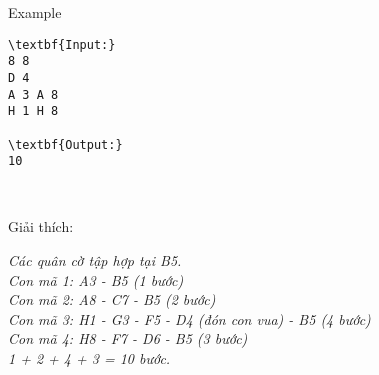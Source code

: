Example
\begin{verbatim}
\textbf{Input:}
8 8
D 4
A 3 A 8
H 1 H 8

\textbf{Output:}
10\end{verbatim}

 

Giải thích:

\emph{Các quân cờ tập hợp tại B5.
\\Con mã 1: A3 - B5 (1 bước)
\\Con mã 2: A8 - C7 - B5 (2 bước)
\\Con mã 3: H1 - G3 - F5 - D4 (đón con vua) - B5 (4 bước)
\\Con mã 4: H8 - F7 - D6 - B5 (3 bước)
\\1 + 2 + 4 + 3 = 10 bước. }